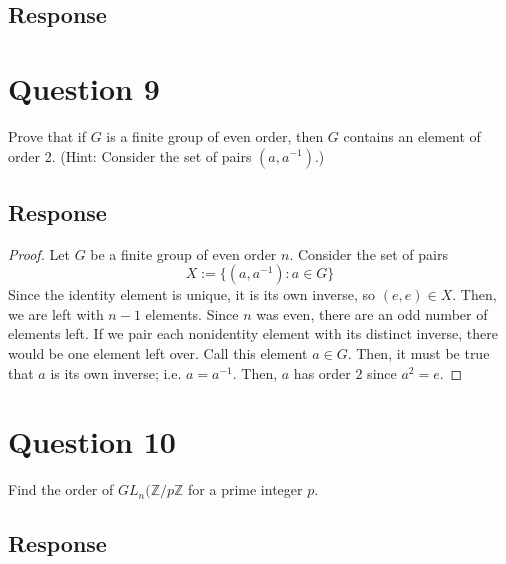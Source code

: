 \documentclass[13pt]{article}
\begin{document}
\subsection*{Response}





\newpage
\section*{Question 9}
Prove that if $G$ is a finite group of even order, then $G$ contains an element of order 2. (Hint:
Consider the set of pairs $(a, a^{-1})$.)

\subsection*{Response}
\begin{proof}
    Let $G$ be a finite group of even order $n$. Consider the set of pairs 
    \[X := \{ (a, a^{-1}) : a \in G \}\]
    Since the identity element is unique, it is its own inverse, so $(e, e) \in X$. Then, 
    we are left with $n - 1$ elements. Since $n$ was even, there are an odd number of elements left. 
    If we pair each nonidentity element with its distinct inverse, there would be one element left 
    over. Call this element $a \in G$. Then, it must be true that $a$ is its own inverse; i.e. 
    $a = a^{-1}$. Then, $a$ has order $2$ since $a^2 = e$.
\end{proof}




\newpage
\section*{Question 10}
Find the order of $GL_n(\mathbb{Z}/p\mathbb{Z}$ for a prime integer $p$.

\subsection*{Response}
\end{document}
